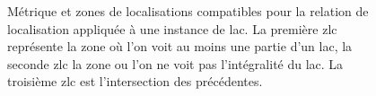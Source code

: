 \begin{figure}
  \hspace{1cm}
  \caption{Métrique \protect{} et zones de
    localisations compatibles pour la relation de localisation
    \protect{} appliquée à une instance de
    lac. La première \ac{zlc} \protect{}
    représente la zone où l'on voit au moins une partie d'un lac, la
    seconde \ac{zlc} \protect{} la zone ou l'on
    ne voit pas l'intégralité du lac. La troisième \ac{zlc}
    \protect{} est l'intersection des
    précédentes.}
  \label{fig:visib}
\end{figure}


